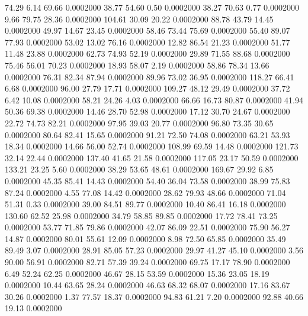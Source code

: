   74.29    6.14   69.66   0.0002000
  38.77   54.60    0.50   0.0002000
  38.27   70.63    0.77   0.0002000
   9.66   79.75   28.36   0.0002000
 104.61   30.09   20.22   0.0002000
  88.78   43.79   14.45   0.0002000
  49.97   14.67   23.45   0.0002000
  58.46   73.44   75.69   0.0002000
  55.40   89.07   77.93   0.0002000
  53.02   13.02   76.16   0.0002000
  12.82   86.54   21.23   0.0002000
  51.77   11.48   23.88   0.0002000
  62.73   74.93   52.19   0.0002000
  29.89   71.55   88.68   0.0002000
  75.46   56.01   70.23   0.0002000
  18.93   58.07    2.19   0.0002000
  58.86   78.34   13.66   0.0002000
  76.31   82.34   87.94   0.0002000
  89.96   73.02   36.95   0.0002000
 118.27   66.41    6.68   0.0002000
  96.00   27.79   17.71   0.0002000
 109.27   48.12   29.49   0.0002000
  37.72    6.42   10.08   0.0002000
  58.21   24.26    4.03   0.0002000
  66.66   16.73   80.87   0.0002000
  41.94   50.36   69.38   0.0002000
  14.46   28.70   52.98   0.0002000
  17.12   30.70   24.67   0.0002000
  22.72   74.73   82.21   0.0002000
  97.95   39.03   20.77   0.0002000
  96.80   73.35   30.65   0.0002000
  80.64   82.41   15.65   0.0002000
  91.21   72.50   74.08   0.0002000
  63.21   53.93   18.34   0.0002000
  14.66   56.00   52.74   0.0002000
 108.99   69.59   14.48   0.0002000
 121.73   32.14   22.44   0.0002000
 137.40   41.65   21.58   0.0002000
 117.05   23.17   50.59   0.0002000
 133.21   23.25    5.60   0.0002000
  38.29   53.65   48.61   0.0002000
 169.67   29.92    6.85   0.0002000
  45.35   85.41   14.43   0.0002000
  54.40   36.04   73.58   0.0002000
  38.99   75.83   87.24   0.0002000
   4.55   77.08   14.42   0.0002000
  28.62   79.93   48.66   0.0002000
  71.04   51.31    0.33   0.0002000
  39.00   84.51   89.77   0.0002000
  10.40   86.41   16.18   0.0002000
 130.60   62.52   25.98   0.0002000
  34.79   58.85   89.85   0.0002000
  17.72   78.41   73.25   0.0002000
  53.77   71.85   79.86   0.0002000
  42.07   86.09   22.51   0.0002000
  75.90   56.27   14.87   0.0002000
  80.01   55.61   12.09   0.0002000
   8.98   72.50   65.85   0.0002000
  35.49   89.49    3.07   0.0002000
  28.91   85.05   57.23   0.0002000
  29.97   41.27   45.10   0.0002000
   3.56   90.00   56.91   0.0002000
  82.71   57.39   39.24   0.0002000
  69.75   17.17   78.90   0.0002000
   6.49   52.24   62.25   0.0002000
  46.67   28.15   53.59   0.0002000
  15.36   23.05   18.19   0.0002000
  10.44   63.65   28.24   0.0002000
  46.63   68.32   68.07   0.0002000
  17.16   83.67   30.26   0.0002000
   1.37   77.57   18.37   0.0002000
  94.83   61.21    7.20   0.0002000
  92.88   40.66   19.13   0.0002000
